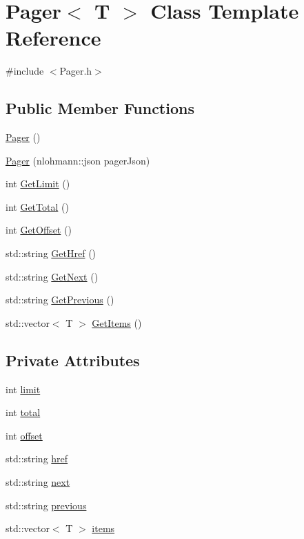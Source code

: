 \hypertarget{class_pager}{}\section{Pager$<$ T $>$ Class Template Reference}
\label{class_pager}


{\ttfamily \#include $<$Pager.\+h$>$}

\subsection*{Public Member Functions}
\begin{DoxyCompactItemize}
\item 
\mbox{\hyperlink{class_pager_a757290933bf0ac30c6a97a93b4b756ee}{Pager}} ()
\item 
\mbox{\hyperlink{class_pager_ab2467f63b7aa9170476a56d0c8722f6e}{Pager}} (nlohmann\+::json pager\+Json)
\item 
int \mbox{\hyperlink{class_pager_ab842aa447c2f10afd16cbb96ea6a5d86}{Get\+Limit}} ()
\item 
int \mbox{\hyperlink{class_pager_adee5e1fbcf56e1a98b486b57cbe00f74}{Get\+Total}} ()
\item 
int \mbox{\hyperlink{class_pager_af5bd96d8da2ed1c03f8091a399ca17f1}{Get\+Offset}} ()
\item 
std\+::string \mbox{\hyperlink{class_pager_adb9bd9a240972d680f85b46ada1f12e0}{Get\+Href}} ()
\item 
std\+::string \mbox{\hyperlink{class_pager_aabe78de5ddc316bdbf28c27b7e6fe19c}{Get\+Next}} ()
\item 
std\+::string \mbox{\hyperlink{class_pager_aa1273fc3e89afe229a51f5008f70d536}{Get\+Previous}} ()
\item 
std\+::vector$<$ T $>$ \mbox{\hyperlink{class_pager_a16daa7a4ba8cc92deeddce04ea8075bf}{Get\+Items}} ()
\end{DoxyCompactItemize}
\subsection*{Private Attributes}
\begin{DoxyCompactItemize}
\item 
int \mbox{\hyperlink{class_pager_a9f8cb117c3ad77313d043507753138de}{limit}}
\item 
int \mbox{\hyperlink{class_pager_ac2ddd61004a9a04b595a2dbe7bd57193}{total}}
\item 
int \mbox{\hyperlink{class_pager_a96252ba885da495cbc14bd10ee9aedf1}{offset}}
\item 
std\+::string \mbox{\hyperlink{class_pager_ab50b06321306f4a68f83620c4429bfbf}{href}}
\item 
std\+::string \mbox{\hyperlink{class_pager_aa23a9b59e82bc559213402dff9c49015}{next}}
\item 
std\+::string \mbox{\hyperlink{class_pager_ae604dd43254bb9caec42460483aa11ce}{previous}}
\item 
std\+::vector$<$ T $>$ \mbox{\hyperlink{class_pager_a82bffcbf9375672986431dd661104a66}{items}}
\end{DoxyCompactItemize}



